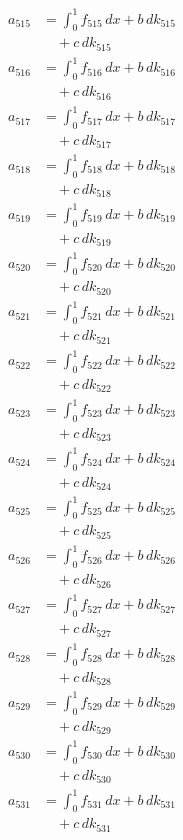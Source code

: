 \documentclass{article}
\begin{document}
\begin{align}
a_{515} &= \int_0^1 f_{515}\,dx + b\,dk_{515} \\
&\quad + c\,dk_{515} \\
a_{516} &= \int_0^1 f_{516}\,dx + b\,dk_{516} \\
&\quad + c\,dk_{516} \\
a_{517} &= \int_0^1 f_{517}\,dx + b\,dk_{517} \\
&\quad + c\,dk_{517} \\
a_{518} &= \int_0^1 f_{518}\,dx + b\,dk_{518} \\
&\quad + c\,dk_{518} \\
a_{519} &= \int_0^1 f_{519}\,dx + b\,dk_{519} \\
&\quad + c\,dk_{519} \\
a_{520} &= \int_0^1 f_{520}\,dx + b\,dk_{520} \\
&\quad + c\,dk_{520} \\
a_{521} &= \int_0^1 f_{521}\,dx + b\,dk_{521} \\
&\quad + c\,dk_{521} \\
a_{522} &= \int_0^1 f_{522}\,dx + b\,dk_{522} \\
&\quad + c\,dk_{522} \\
a_{523} &= \int_0^1 f_{523}\,dx + b\,dk_{523} \\
&\quad + c\,dk_{523} \\
a_{524} &= \int_0^1 f_{524}\,dx + b\,dk_{524} \\
&\quad + c\,dk_{524} \\
a_{525} &= \int_0^1 f_{525}\,dx + b\,dk_{525} \\
&\quad + c\,dk_{525} \\
a_{526} &= \int_0^1 f_{526}\,dx + b\,dk_{526} \\
&\quad + c\,dk_{526} \\
a_{527} &= \int_0^1 f_{527}\,dx + b\,dk_{527} \\
&\quad + c\,dk_{527} \\
a_{528} &= \int_0^1 f_{528}\,dx + b\,dk_{528} \\
&\quad + c\,dk_{528} \\
a_{529} &= \int_0^1 f_{529}\,dx + b\,dk_{529} \\
&\quad + c\,dk_{529} \\
a_{530} &= \int_0^1 f_{530}\,dx + b\,dk_{530} \\
&\quad + c\,dk_{530} \\
a_{531} &= \int_0^1 f_{531}\,dx + b\,dk_{531} \\
&\quad + c\,dk_{531} \\

\end{align}
\end{document}
